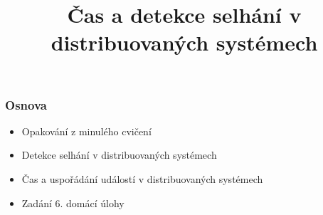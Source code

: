 \documentclass[usenames,dvipsnames,9pt]{beamer}
\title{Čas a detekce selhání v distribuovaných systémech}
\date{}
\institute{B4B36PDV -- Paralelní a distribuované výpočty}
\begin{document}
\maketitle

\begin{frame}
  \frametitle{Osnova}
  \begin{itemize}
    \item Opakování z minulého cvičení\\[1.5em]
    \item Detekce selhání v distribuovaných systémech
    \item Čas a uspořádání událostí v distribuovaných systémech\\[1.5em]
    \item Zadání 6. domácí úlohy
  \end{itemize}
\end{frame}
\end{document}
